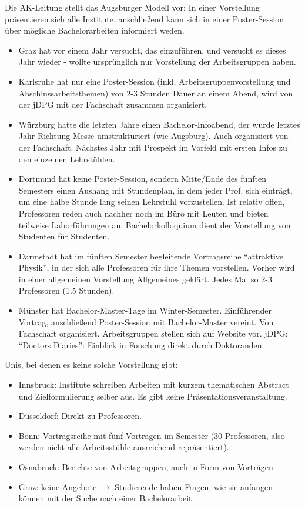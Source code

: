     Die AK-Leitung stellt das Augsburger Modell vor: In einer Vorstellung präsentieren sich alle Institute, anschließend kann sich in einer Poster-Session über mögliche Bachelorarbeiten informiert weden. \\
    \begin{itemize}
      \item Graz hat vor einem Jahr versucht, das einzuführen, und versucht es dieses Jahr wieder - wollte ursprünglich nur Vorstellung der Arbeitsgruppen haben.
      \item Karlsruhe hat nur eine Poster-Session (inkl. Arbeitsgruppenvorstellung und Abschlussarbeitsthemen) von 2-3 Stunden Dauer an einem Abend, wird von der jDPG mit der Fachschaft zusammen organisiert.
      \item Würzburg hatte die letzten Jahre einen Bachelor-Infoabend, der wurde letztes Jahr Richtung Messe umstrukturiert (wie Augsburg). Auch organisiert von der Fachschaft. Nächstes Jahr mit Prospekt im Vorfeld mit ersten Infos zu den einzelnen Lehrstühlen.
      \item Dortmund hat keine Poster-Session, sondern Mitte/Ende des fünften Semesters einen Aushang mit Stundenplan, in dem jeder Prof. sich einträgt, um eine halbe Stunde lang seinen Lehrstuhl vorzustellen. Ist relativ offen, Professoren reden auch nachher noch im Büro mit Leuten und bieten teilweise Laborführungen an. Bachelorkolloquium dient der Vorstellung von Studenten für Studenten.
      \item Darmstadt hat im fünften Semester begleitende Vortragsreihe “attraktive Physik”, in der sich alle Professoren für ihre Themen vorstellen. Vorher wird in einer allgemeinen Vorstellung Allgemeines geklärt. Jedes Mal so 2-3 Professoren (1.5 Stunden).
      \item Münster hat Bachelor-Master-Tage im Winter-Semester. Einführender Vortrag, anschließend Poster-Session mit Bachelor-Master vereint. Von Fachschaft organisiert. Arbeitsgruppen stellen sich auf Website vor. jDPG: “Doctors Diaries”: Einblick in Forschung direkt durch Doktoranden.
    \end{itemize}

    Unis, bei denen es keine solche Vorstellung gibt: \\
    \begin{itemize}
      \item Innsbruck: Institute schreiben Arbeiten mit kurzem thematischen Abstract und Zielformulierung selber aus. Es gibt keine Präsentationsveranstaltung.
      \item Düsseldorf: Direkt zu Professoren.
      \item Bonn: Vortragsreihe mit fünf Vorträgen im Semester (30 Professoren, also werden nicht alle Arbeitsstühle ausreichend repräsentiert).
      \item Osnabrück: Berichte von Arbeitsgruppen, auch in Form von Vorträgen
      \item Graz: keine Angebote $\rightarrow$ Studierende haben Fragen, wie sie anfangen können mit der Suche nach einer Bachelorarbeit
    \end{itemize}

